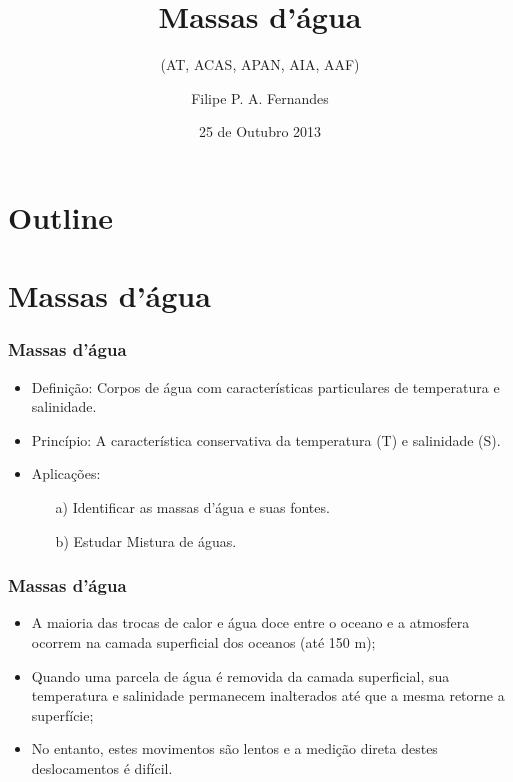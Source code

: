 \title[Aula 08]{Massas d'água}
\subtitle{(AT, ACAS, APAN, AIA, AAF)}
\author[Filipe Fernandes]{Filipe P. A. Fernandes}
\date[Outubro 2013]{25 de Outubro 2013}




\begin{frame}[plain]
  \titlepage
\end{frame}

\section*{Outline}
\begin{frame}
\tableofcontents
\end{frame}

\section{Massas d'água}
\begin{frame}
\frametitle{Massas d'água}
  \begin{itemize}[<+-| alert@+>]
    \item Definição: Corpos de água com características particulares de
          temperatura e salinidade.
    \item Princípio: A característica conservativa da temperatura (T) e
          salinidade (S).
    \item Aplicações:
      \begin{enumerate}[<+-| alert@+>]
        \item[a)] Identificar as massas d'água e suas fontes.
        \item[b)] Estudar Mistura de águas.
      \end{enumerate}
  \end{itemize}
\end{frame}


\begin{frame}
\frametitle{Massas d'água}
  \begin{itemize}[<+-| alert@+>]
    \item A maioria das trocas de calor e água doce entre o oceano e a
          atmosfera ocorrem na camada superficial dos oceanos (até 150 m);
    \item Quando uma parcela de água é removida da camada superficial, sua
          temperatura e salinidade permanecem inalterados até que a mesma
          retorne a superfície;
    \item No entanto, estes movimentos são lentos e a medição direta destes
          deslocamentos é difícil.
  \end{itemize}
\end{frame}


